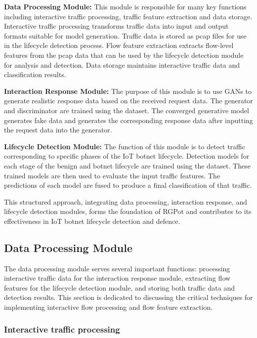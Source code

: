 \documentclass[journal]{IEEEtai}
\begin{document}
\textbf{Data Processing Module: }
This module is responsible for many key functions including interactive traffic processing, traffic feature extraction and data storage.
Interactive traffic processing transforms traffic data into input and output formats suitable for model generation.
Traffic data is stored as pcap files for use in the lifecycle detection process.
Flow feature extraction extracts flow-level features from the pcap data that can be used by the lifecycle detection module for analysis and detection.
Data storage maintains interactive traffic data and classification results.

\textbf{Interaction Response Module: }
The purpose of this module is to use GANs to generate realistic response data based on the received request data.
The generator and discriminator are trained using the dataset.
The converged generative model generates fake data and generates the corresponding response data after inputting the request data into the generator.

\textbf{Lifecycle Detection Module: }
The function of this module is to detect traffic corresponding to specific phases of the IoT botnet lifecycle.
Detection models for each stage of the benign and botnet lifecycle are trained using the dataset.
These trained models are then used to evaluate the input traffic features.
The predictions of each model are fused to produce a final classification of that traffic.

This structured approach, integrating data processing, interaction response, and lifecycle detection modules, forms the foundation of RGPot and contributes to its effectiveness in IoT botnet lifecycle detection and defence.



\subsection{Data Processing Module}
\label{Data processing module}
The data processing module serves several important functions: processing interactive traffic data for the interaction response module, extracting flow features for the lifecycle detection module, and storing both traffic data and detection results. 
This section is dedicated to discussing the critical techniques for implementing interactive flow processing and flow feature extraction.



\subsubsection{Interactive traffic processing}
\label{Interactive traffic processing}
\end{document}

